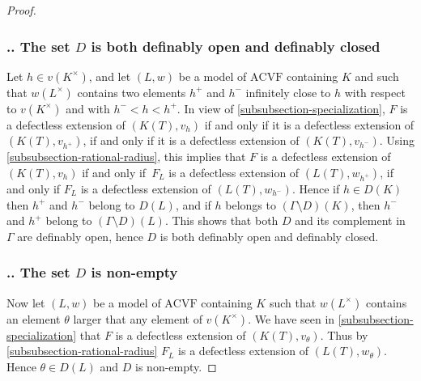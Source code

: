 \documentclass[JEP,XML,SOM,Unicode,ThmDefs,NoEqCountersInSection,published]{cedram}
\newcounter{paragraphe}
\renewcommand\theparagraphe{\thesubsubsection.\arabic{paragraphe}}
\newcommand{\acvf}{\mathrm{ACVF}}
\theoremstyle{plain}
\theoremstyle{definition}
\begin{document}
\begin{proof}
\subsubsection*{\textup{\theparagraphe}. The set $D$ is both definably open and definably closed}\label{d-openandclosed}
Let $h\in v(K^\times)$, and let
$(L,w)$ be a model of $\acvf$ containing $K$ and
such that $w(L^\times)$ contains two elements $h^+$
and $h^-$ infinitely close to $h$ with respect to $v(K^\times)$
and with $h^-<h<h^+$. In view of \ref{subsubsection-specialization},
$F$ is a defectless extension of $(K(T),v_h)$ if and only if
it is a defectless extension of $(K(T),v_{h^+})$, if and only if
it is a defectless extension of $(K(T),v_{h^-})$. Using
\ref{subsubsection-rational-radius}, this implies that
$F$ is a defectless extension of $(K(T),v_h)$ if and only if~$F_L$ is a defectless extension of $(L(T),w_{h^+})$, if and only if
$F_L$ is a defectless extension of $(L(T),w_{h^-})$. Hence
if $h\in D(K)$ then $h^+$ and $h^{-}$ belong to
$D(L)$, and if $h$ belongs to $(\Gamma\setminus D)(K)$, then
$h^{-}$ and $h^{+}$ belong to $(\Gamma\setminus D)(L)$. This shows
that both $D$ and its complement in $\Gamma$ are definably open, hence
$D$ is both definably open and definably closed.

\subsubsection*{\textup{\theparagraphe}. The set $D$ is non-empty}\label{d-nonempty}
Now let $(L,w)$ be a model of $\acvf$ containing $K$ such that $w(L^\times)$ contains
an element $\theta$ larger that any element of $v(K^\times)$.
We have seen in \ref{subsubsection-specialization}
that $F$ is a defectless extension of $(K(T),v_\theta)$. Thus
by \ref{subsubsection-rational-radius} $F_L$ is a defectless extension of $(L(T),w_\theta)$. Hence $\theta\in D(L)$ and $D$ is non-empty.
\end{proof}

\backmatter


\end{document}
